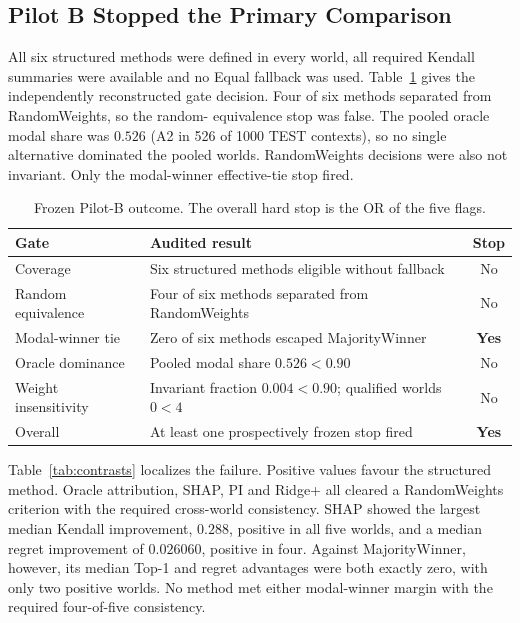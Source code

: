 \documentclass[runningheads]{llncs}
\begin{document}
\subsection{Pilot B Stopped the Primary Comparison}
\label{sec:pilotb}

All six structured methods were defined in every world, all required Kendall summaries were
available and no Equal fallback was used. Table~\ref{tab:gateoutcome} gives the independently
reconstructed gate decision. Four of six methods separated from RandomWeights, so the random-
equivalence stop was false. The pooled oracle modal share was $0.526$ (A2 in 526 of 1000 TEST
contexts), so no single alternative dominated the pooled worlds. RandomWeights decisions were
also not invariant. Only the modal-winner effective-tie stop fired.

\begin{table}[t]
\centering
\caption{Frozen Pilot-B outcome. The overall hard stop is the OR of the five flags.}
\label{tab:gateoutcome}
\small
\begin{tabularx}{\linewidth}{@{}lXc@{}}
\toprule
Gate & Audited result & Stop\\
\midrule
Coverage & Six structured methods eligible without fallback & No\\
Random equivalence & Four of six methods separated from RandomWeights & No\\
Modal-winner tie & Zero of six methods escaped MajorityWinner & \textbf{Yes}\\
Oracle dominance & Pooled modal share $0.526<0.90$ & No\\
Weight insensitivity & Invariant fraction $0.004<0.90$; qualified worlds $0<4$ & No\\
\midrule
Overall & At least one prospectively frozen stop fired & \textbf{Yes}\\
\bottomrule
\end{tabularx}
\end{table}

Table~\ref{tab:contrasts} localizes the failure. Positive values favour the structured method.
Oracle attribution, SHAP, PI and Ridge+ all cleared a RandomWeights criterion with the required
cross-world consistency. SHAP showed the largest median Kendall improvement, $0.288$, positive
in all five worlds, and a median regret improvement of $0.026060$, positive in four. Against
MajorityWinner, however, its median Top-1 and regret advantages were both exactly zero, with only
two positive worlds. No method met either modal-winner margin with the required four-of-five
consistency.
\end{document}
